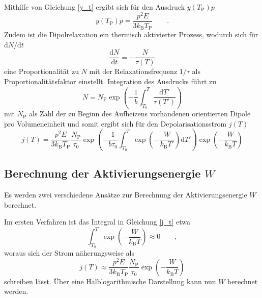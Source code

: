 Mithilfe von Gleichung \eqref{y_t} ergibt sich für den Ausdruck $y(T_\mathrm{P}) p$
\begin{equation}
    y(T_\mathrm{P}) p = \frac{p^2 E}{3 k_\mathrm{B} T_\mathrm{P}} \qquad .
\end{equation}
Zudem ist die Dipolrelaxation ein thermisch aktivierter Prozess, wodurch sich für $\mathrm{d}N/\mathrm{d}t$ 
\begin{equation}
    \frac{\mathrm{d}N}{\mathrm{d}t} = -\frac{N}{\tau(T)}
\end{equation}
eine Proportionalität zu $N$ mit der Relaxationsfrequenz $1/\tau$ als Proportionalitätsfaktor einstellt.
Integration des Ausdrucks führt zu 
\begin{equation*}
    N = N_\mathrm{P} \exp{ \left( - \frac{ 1 }{ b } \int_{T_0}^T \frac{ \mathrm{d}T' }{ \tau(T') } \right )}
\end{equation*}
mit $N_\mathrm{P}$ als Zahl der zu Beginn des Aufheizens vorhandenen orientierten Dipole pro Volumeneinheit
und somit ergibt sich für den Depolarisationsstrom $j(T)$
\begin{equation}
    j(T) = \frac{ p^2 E }{ 3 k_\mathrm{B} T_\mathrm{P} } \frac{ N_\mathrm{P} }{ \tau_0 } \exp{ \left( - \frac{ 1 }{ b \tau_0 } \int_{T_0}^T \exp{ \left( - \frac{ W }{ k_\mathrm{B} T' } \right) \mathrm{d}T' } \right) } \exp{ \left( -\frac{ W }{ k_\mathrm{B} T } \right) } \label{j_t}
\end{equation}

\subsection{Berechnung der Aktivierungsenergie $W$} %
\label{sub:berechnung_der_aktivierungsenergie_w_}

Es werden zwei verschiedene Ansätze zur Berechnung der Aktivierungsenergie $W$ berechnet.

Im ersten Verfahren ist das Integral in Gleichung \eqref{j_t} etwa
\begin{equation*}
    \int_{T_0}^T \exp{ \left( - \frac{ W }{ k_\mathrm{B} T } \right )} \approx 0 \qquad , 
\end{equation*}
woraus sich der Strom näherungsweise als
\begin{equation}
    \label{eqn:approx}
    j(T) \approx \frac{ p^2 E }{ 3 k_\mathrm{B} T_\mathrm{P} } \frac{ N_\mathrm{P} }{ \tau_0 } \exp{ \left( - \frac{ W }{ k_\mathrm{B} T} \right ) }
\end{equation}
schreiben lässt.
Über eine Halblogarithmische Darstellung kann nun $W$ berechnet werden.

